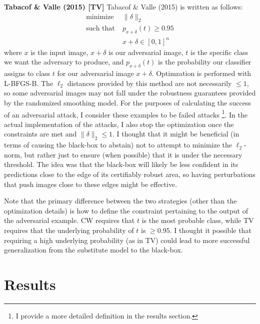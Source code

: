 \documentclass{article}
\begin{document}
\textbf{Tabacof \& Valle (2015) [TV]} \newline
Tabacof \& Valle (2015) \cite{TV15} is written as follows:
\begin{align}
    \text{minimize}  &\; \| \delta \|_2  \nonumber \\
    \text{such that} &\; p_{x+\delta}(t) \geq 0.95  \nonumber \\
                     &\; x + \delta \in [0,1]^n \nonumber
\end{align}
where $x$ is the input image, $x + \delta$ is our adversarial image, $t$ is the specific class we want the adversary to produce, and $p_{x+\delta}(t)$ is the probability our classifier assigns to class $t$ for our adversarial image $x+\delta$. Optimzation is performed with L-BFGS-B.\cite{ZBLN97} The $\ell_2$ distances provided by this method are not necessarily $\leq 1$, so some adversarial images may not fall under the robustness guarantees provided by the randomized smoothing model. For the purposes of calculating the success of an adversarial attack, I consider these examples to be failed attacks \footnote{I provide a more detailed definition in the results section.}. In the actual implementation of the attacks, I also stop the optimization once the constraints are met and $\| \delta \|_2 \leq 1$. I thought that it might be beneficial (in terms of causing the black-box to abstain) not to attempt to minimize the $\ell_2$-norm, but rather just to ensure (when possible) that it is under the necessary threshold. The idea was that the black-box will likely be less confident in its predictions close to the edge of its certifiably robust area, so having perturbations that push images close to these edges might be effective. \newline

Note that the primary difference between the two strategies (other than the optimization details) is how to define the constraint pertaining to the output of the adversarial example. CW requires that $t$ is the most probable class, while TV requires that the underlying probability of $t$ is $\geq 0.95$. I thought it possible that requiring a high underlying probability (as in TV) could lead to more successful generalization from the substitute model to the black-box. \newline

\section{Results}
\end{document}
